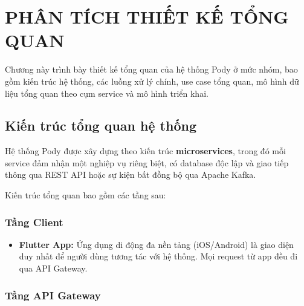 \documentclass[14pt,a4paper,oneside]{extreport}
\begin{document}


\chapter{PHÂN TÍCH THIẾT KẾ TỔNG QUAN}
\label{chap:thiet-ke-tong-quan}

Chương này trình bày thiết kế tổng quan của hệ thống Pody ở mức nhóm, bao gồm kiến trúc hệ thống, các luồng xử lý chính, use case tổng quan, mô hình dữ liệu tổng quan theo cụm service và mô hình triển khai.

\section{Kiến trúc tổng quan hệ thống}
\label{sec:kien-truc}

Hệ thống Pody được xây dựng theo kiến trúc \textbf{microservices}, trong đó mỗi service đảm nhận một nghiệp vụ riêng biệt, có database độc lập và giao tiếp thông qua REST API hoặc sự kiện bất đồng bộ qua Apache Kafka.

Kiến trúc tổng quan bao gồm các tầng sau:

\subsection{Tầng Client}

\begin{itemize}[leftmargin=2cm]
  \item \textbf{Flutter App:} Ứng dụng di động đa nền tảng (iOS/Android) là giao diện duy nhất để người dùng tương tác với hệ thống. Mọi request từ app đều đi qua API Gateway.
\end{itemize}

\subsection{Tầng API Gateway}
\end{document}

